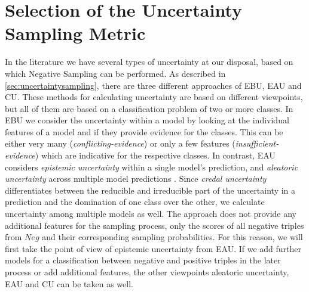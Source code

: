 \section{Selection of the Uncertainty Sampling Metric} 
\label{sec:selection_of_the_uncertainty_sampling_metric}
In the literature we have several types of uncertainty at our disposal, based on which Negative Sampling can be performed.
As described in \autoref{sec:uncertaintysampling}, there are three different approaches of \ac{EBU}, \ac{EAU} and \ac{CU}.
These methods for calculating uncertainty are based on different viewpoints, but all of them are based on a classification problem of two or more classes.
In \ac{EBU} we consider the uncertainty within a model by looking at the individual features of a model and if they provide evidence for the classes.
This can be either very many (\textit{conflicting-evidence}) or only a few features (\textit{insufficient-evidence}) which are indicative for the respective classes.
In contrast, \ac{EAU} considers \textit{epistemic uncertainty} within a single model’s prediction, and \textit{aleatoric uncertainty} across multiple model predictions \cite{human-in-the-loop}.
Since \textit{credal uncertainty} differentiates between the
reducible and irreducible part of the uncertainty in a prediction and the domination of one class over the other, we calculate uncertainty among multiple models as well.
The \kbgan approach does not provide any additional features for the sampling process, only the scores of all negative triples from $Neg$ and their corresponding sampling probabilities.
For this reason, we will first take the point of view of epistemic uncertainty from \ac{EAU}.
If we add further models for a classification between negative and positive triples in the later process or add additional features, the other viewpoints aleatoric uncertainty, \ac{EAU} and \ac{CU} can be taken as well.



